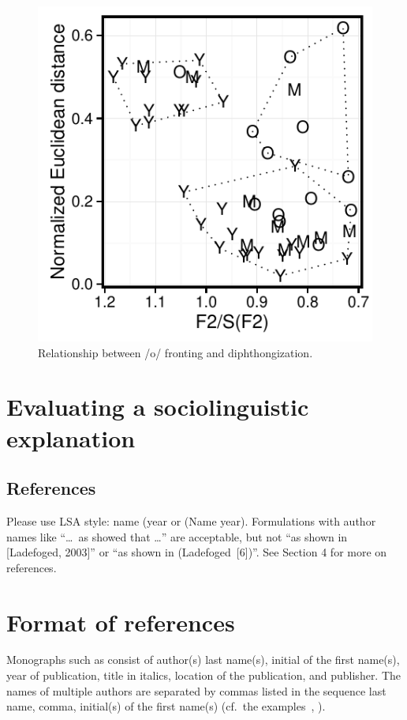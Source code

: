 \documentclass[12pt]{article}
\begin{document}
\begin{figure}
\centering
\includegraphics[scale=0.9]{ofrontingdip.pdf}
\caption{Relationship between /o/ fronting and diphthongization.}
\end{figure}

\section{Evaluating a sociolinguistic explanation}


\subsection{References}

Please use LSA style: name (year or (Name year). Formulations
with author names like ``\ldots\ as 
showed that \ldots'' are acceptable, but not ``as shown in [Ladefoged,
2003]'' or ``as shown in (Ladefoged~[6])''. See Section 4 for more on references.


\section{Format of references}

Monographs such as  consist of author(s) last name(s),
initial of the first name(s), year of publication, title in italics, location of the publication, and publisher. The names of multiple authors are separated by commas listed in the 
sequence last name, comma, initial(s) of the first name(s) (cf.\ the examples~, ). 
\end{document}
